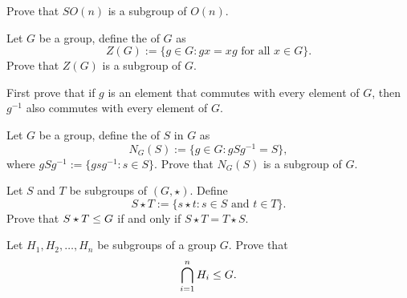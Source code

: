 \documentclass{ximera}
\begin{document}
\begin{exercise}
  Prove that $SO(n)$ is a subgroup of $O(n)$.
\end{exercise}


\begin{exercise}\label{E:center}
  Let $G$ be a group, define the  of $G$ as
  \[
  Z(G):=\{g\in G: \text{$gx=xg$ for all $x\in G$}\}.
  \]
  Prove that $Z(G)$ is a subgroup of $G$.
  \begin{hint}
    First prove that if $g$ is an element that commutes with every
    element of $G$, then $g^{-1}$ also commutes with every element of
    $G$.
  \end{hint}
\end{exercise}


\begin{exercise}
  Let $G$ be a group, define the  of $S$ in $G$ as
  \[
  N_G(S):=\{g\in G: \text{$gSg^{-1} = S$}\},
  \]
  where $gSg^{-1}:=\{g sg^{-1}:s\in S\}$. Prove that $N_G(S)$ is a
  subgroup of $G$.
\end{exercise}



\begin{exercise}
  Let $S$ and $T$ be subgroups of $(G,\star)$. Define
  \[
  S\star T := \{ s\star t: \text{$s\in S$ and $t\in T$}\}.
  \]
  Prove that $S\star T\leq G$ if and only if $S\star T = T\star S$.
\end{exercise}






\begin{exercise}
  Let $H_1,H_2,\dots,H_n$ be subgroups of a group $G$. Prove that
  \[
  \bigcap_{i=1}^n H_i \leq G.
  \]
\end{exercise}



\end{document}
